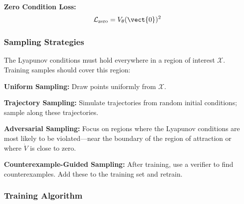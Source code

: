 \textbf{Zero Condition Loss:}
\begin{equation}
\mathcal{L}_{\text{zero}} = V_\theta(\vect{0})^2
\end{equation}

\subsubsection{Sampling Strategies}

The Lyapunov conditions must hold everywhere in a region of interest $\mathcal{X}$. Training samples should cover this region:

\textbf{Uniform Sampling:} Draw points uniformly from $\mathcal{X}$.

\textbf{Trajectory Sampling:} Simulate trajectories from random initial conditions; sample along these trajectories.

\textbf{Adversarial Sampling:} Focus on regions where the Lyapunov conditions are most likely to be violated---near the boundary of the region of attraction or where $\dot{V}$ is close to zero.

\textbf{Counterexample-Guided Sampling:} After training, use a verifier to find counterexamples. Add these to the training set and retrain.

\subsubsection{Training Algorithm}

